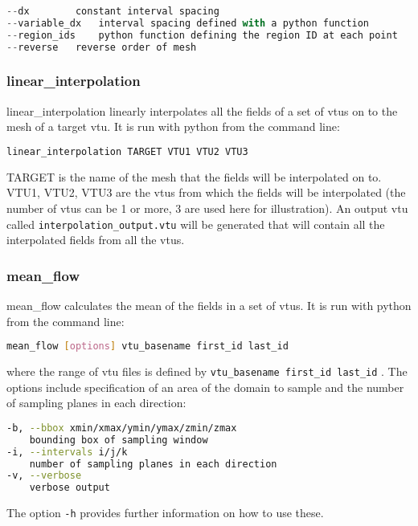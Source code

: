 \begin{lstlisting}[language = Python]
--dx		constant interval spacing
--variable_dx	interval spacing defined with a python function
--region_ids	python function defining the region ID at each point
--reverse	reverse order of mesh
\end{lstlisting}


\subsubsection{linear\_interpolation}
\label{sec:scripts_linear_interpolation}
linear\_interpolation linearly interpolates all the fields of a set of vtus on to the mesh of a target vtu. It is run with python from the command line:
\begin{lstlisting}[language = Bash]
linear_interpolation TARGET VTU1 VTU2 VTU3
\end{lstlisting}
TARGET is the name of the mesh that the fields will be interpolated on to. VTU1, VTU2, VTU3 are the vtus from which the fields will be interpolated (the number of vtus can be 1 or more, 3 are used here for illustration). An output vtu called \lstinline[language = Bash]+interpolation_output.vtu+ will be generated that will contain all the interpolated fields from all the vtus.


\subsubsection{mean\_flow}
\label{sec:mean_flow}

mean\_flow calculates the mean of the fields in a set of vtus. It is run with python from the command line:
\begin{lstlisting}[language = Bash]
mean_flow [options] vtu_basename first_id last_id
\end{lstlisting}
where the range of vtu files is defined by \lstinline[language = python]+vtu_basename first_id last_id+ .
The options include specification of an area of the domain to sample and the number of sampling planes in each direction:
\begin{lstlisting}[language = Bash]
-b, --bbox xmin/xmax/ymin/ymax/zmin/zmax
	bounding box of sampling window
-i, --intervals i/j/k
	number of sampling planes in each direction
-v, --verbose
   	verbose output
\end{lstlisting}
The option \lstinline[language = Bash]+-h+ provides further information on how to use these.

